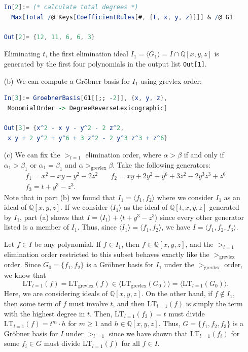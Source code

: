 \documentclass[12pt]{amsart}
\theoremstyle{definition}
\begin{document}
\begin{flushleft}
\begin{enumerate}
\begin{lstlisting}[language=Mathematica]
In[2]:= (* calculate total degrees *)
  Max[Total /@ Keys[CoefficientRules[#, {t, x, y, z}]]] & /@ G1 

Out[2]= {12, 11, 6, 6, 3}
    \end{lstlisting}
    Eliminating $t$, the first elimination ideal $I_1 = \langle G_1\rangle= I \cap \mathbb Q[x,y,z]$ is generated by the first four polynomials in the output list \verb|Out[1]|.

    \item[(b)] We can compute a Gr\"obner basis for $I_1$ using grevlex order:
    \begin{lstlisting}[language=Mathematica]
In[3]:= GroebnerBasis[G1[[;; -2]], {x, y, z}, 
 MonomialOrder -> DegreeReverseLexicographic]

Out[3]= {x^2 - x y - y^2 - 2 z^2, 
 x y + 2 y^2 + y^6 + 3 z^2 - 2 y^3 z^3 + z^6}
    \end{lstlisting}
    \item[(c)] We can fix the $>_{l=1}$ elimination order, where $\alpha > \beta$ if and only if $\alpha_1 > \beta_1$ or $\alpha_1 = \beta_1$ and $\alpha >_\text{grevlex} \beta$. Take the following generators:
    \begin{align*}
    f_1 = x^2-xy-y^2-2z^2 &\quad f_2 =xy+2y^2+y^6+3z^2-2y^3z^3+z^6 \\ f_3=t+y^3-z^3.
    \end{align*}
    Note that in part (b) we found that $I_1 =\langle f_1, f_2\rangle$ where we consider $I_1$ as an ideal of $\mathbb Q[x,y,z]$. If we consider $\langle I_1\rangle$ as the ideal of $\mathbb Q[t,x,y,z]$ generated by $I_1$, part (a) shows that $I = \langle I_1 \rangle + \langle t+y^3-z^3\rangle$ since every other generator listed is a member of $I_1$. Thus, since $\langle I_1\rangle = \langle f_1,f_2\rangle$, we have $I = \langle f_1,f_2,f_3\rangle$.
    
    Let $f \in I$ be any polynomial. If $f \in I_1$, then $f \in \mathbb Q[x,y,z]$, and the $>_{l=1}$ elimination order restricted to this subset behaves exactly like the $>_\text{grevlex}$ order. Since $G_0=\{ f_1,f_2\}$ is a Gr\"obner basis for $I_1$ under the $>_\text{grevlex}$ order, we know that \[\text{LT}_{l=1}(f) =\text{LT}_\text{grevlex}(f) \in \langle \text{LT}_\text{grevlex}(G_0)\rangle = \langle \text{LT}_{l=1}(G_0)\rangle.\] Here, we are considering ideals of $\mathbb Q[x,y,z]$. On the other hand, if $f \not \in I_1$, then some term of $f$ must involve $t$, and then $\text{LT}_{l=1}(f)$ is simply the term with the highest degree in $t$. Then, $\text{LT}_{l=1}(f_3) = t$ must divide $\text{LT}_{l=1}(f)=t^m \cdot h$ for $m \ge 1$ and $h \in \mathbb Q[x,y,z]$. Thus, $G = \{f_1,f_2,f_3\}$ is a Gr\"obner basis for $I$ under $>_{l=1}$ since we have shown that $\text{LT}_{l=1}(f_i)$ for some $f_i \in G$ must divide $\text{LT}_{l=1}(f)$ for all $f \in I$.


\end{enumerate}
\end{flushleft}
\end{document}
